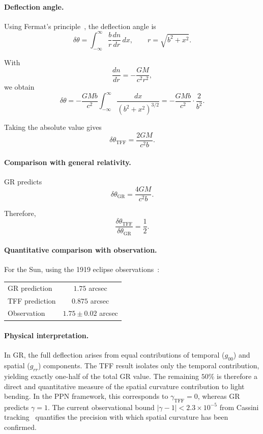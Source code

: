 \documentclass[12pt]{article}
\begin{document}
\paragraph{Deflection angle.}
Using Fermat’s principle~\cite{Bartelmann2010}, the deflection angle is
\begin{equation}
\delta\theta = \int_{-\infty}^{\infty} \frac{b}{r}\frac{dn}{dr}\,dx, \qquad r = \sqrt{b^2 + x^2} .
\end{equation}

With
$$
\frac{dn}{dr} = -\frac{GM}{c^2 r^2} ,
$$
we obtain
$$
\delta\theta = -\frac{GMb}{c^2}\int_{-\infty}^{\infty}\frac{dx}{(b^2+x^2)^{3/2}} = -\frac{GMb}{c^2}\cdot\frac{2}{b^2} .
$$

Taking the absolute value gives
\begin{equation}
\delta\theta_{\text{TFF}} = \frac{2GM}{c^2 b} .
\label{eq:deflection_tff}
\end{equation}

\paragraph{Comparison with general relativity.}
GR predicts
\begin{equation}
\delta\theta_{\text{GR}} = \frac{4GM}{c^2 b} .
\end{equation}

Therefore,
\begin{equation}
\frac{\delta\theta_{\text{TFF}}}{\delta\theta_{\text{GR}}} = \frac{1}{2} .
\end{equation}

\paragraph{Quantitative comparison with observation.}
For the Sun, using the 1919 eclipse observations~\cite{Dyson1920}:
\begin{center}
\begin{tabular}{lc}
\hline
GR prediction & $1.75$ arcsec \\
TFF prediction & $0.875$ arcsec \\
Observation & $1.75 \pm 0.02$ arcsec \\
\hline
\end{tabular}
\end{center}

\paragraph{Physical interpretation.}
In GR, the full deflection arises from equal contributions of temporal ($g_{00}$) and spatial ($g_{rr}$) components. The TFF result isolates only the temporal contribution, yielding exactly one-half of the total GR value. The remaining $50\%$ is therefore a direct and quantitative measure of the spatial curvature contribution to light bending. In the PPN framework, this corresponds to $\gamma_{\text{TFF}} = 0$, whereas GR predicts $\gamma = 1$. The current observational bound $|\gamma - 1| < 2.3 \times 10^{-5}$ from Cassini tracking~\cite{Bertotti2003} quantifies the precision with which spatial curvature has been confirmed.
\end{document}
